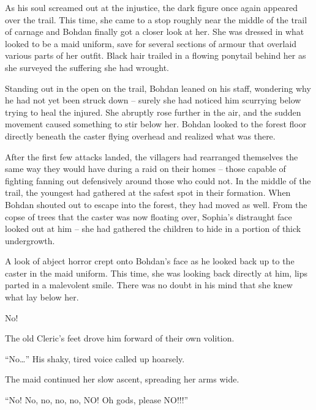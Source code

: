  

As his soul screamed out at the injustice, the dark figure once again appeared over the trail. This time, she came to a stop roughly near the middle of the trail of carnage and Bohdan finally got a closer look at her. She was dressed in what looked to be a maid uniform, save for several sections of armour that overlaid various parts of her outfit. Black hair trailed in a flowing ponytail behind her as she surveyed the suffering she had wrought.

 

Standing out in the open on the trail, Bohdan leaned on his staff, wondering why he had not yet been struck down – surely she had noticed him scurrying below trying to heal the injured. She abruptly rose further in the air, and the sudden movement caused something to stir below her. Bohdan looked to the forest floor directly beneath the caster flying overhead and realized what was there.

 

After the first few attacks landed, the villagers had rearranged themselves the same way they would have during a raid on their homes – those capable of fighting fanning out defensively around those who could not. In the middle of the trail, the youngest had gathered at the safest spot in their formation. When Bohdan shouted out to escape into the forest, they had moved as well. From the copse of trees that the caster was now floating over, Sophia's distraught face looked out at him – she had gathered the children to hide in a portion of thick undergrowth.

 

A look of abject horror crept onto Bohdan’s face as he looked back up to the caster in the maid uniform. This time, she was looking back directly at him, lips parted in a malevolent smile. There was no doubt in his mind that she knew what lay below her.

 

No!

 

The old Cleric’s feet drove him forward of their own volition.

 

“No…” His shaky, tired voice called up hoarsely.

 

The maid continued her slow ascent, spreading her arms wide.

 

“No! No, no, no, no, NO! Oh gods, please NO!!!”

